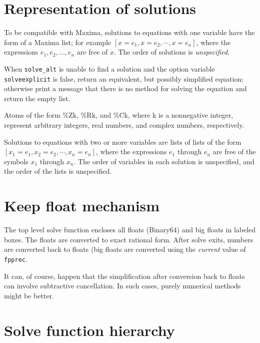 \documentclass[]{scrartcl}
\newcommand{\altsolve}{\texttt{solve\_alt}}
\newcommand{\solveexplicit}{\texttt{solveexplicit}}
\newcommand{\fpprec}{\texttt{fpprec}}
\begin{document}
\section{Representation of solutions}

To be compatible with Maxima, solutions to equations with one variable have the form of a Maxima list; for example \([x = e_1, x = e_2, \cdots, x = e_n]\), where the expressions \(e_1, e_2, \dots, e_n\) are free of \(x\). The order of solutions is \emph{unspecified}.

When \altsolve\/  is unable to find a solution and the option variable \solveexplicit\/ is false, return an equivalent, but possibly simplified equation;  otherwise print a message that there is no method for solving the equation and return the empty list.







Atoms of the form \%Zk, \%Rk, and \%Ck, where k is a nonnegative integer, represent arbitrary integers, real numbers, and complex numbers, respectively.

Solutions to equations with two or more variables are lists of lists of the form \([x_1 = e_1, x_2 = e_2, \cdots, x_n = e_n] \), where the expressions \(e_1\) through \(e_n\) are free of the symbols \(x_1\) through \(x_n \). The order of variables in each solution is unspecified, and the order of the lists is unspecified.

\section{Keep float mechanism}

The top level solve function encloses all floats (Binary64) and big floats in labeled boxes. The floats are converted to exact rational form.
After solve exits, numbers are converted back to floats (big floats are converted using the \emph{current} value of \fpprec.

It can, of course, happen that the simplification after conversion back to floats can involve subtractive cancellation. In such cases, purely numerical methods might be better.

\section{Solve function hierarchy}
\end{document}
